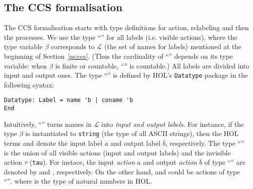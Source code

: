 
\subsection{The CCS formalisation}
\label{ss:formalCCS}

The CCS formalisation starts with type definitions for action,
relabeling and then the  processes. We use the type ``''
for all labels (i.e. visible actions), where the type variable $\beta$ corresponds
to $\mathscr{L}$ (the set of names for labels) mentioned at the beginning
of Section~\ref{ss:ccs}. (Thus the
cardinality of ``'' depends on its type variable:
when $\beta$ is finite or countable, ``'' is countable.)
All labels are divided into input and output ones.
The type ``'' is defined by HOL's \texttt{Datatype} package in the
following syntax:
\begin{lstlisting}
Datatype: Label = name 'b | coname 'b
End
\end{lstlisting}
Intuitively, ``'' turns names in $\mathscr{L}$ into \emph{input and output labels}.
For instance, if the type $\beta$ is instantiated to \texttt{string}
(the type of all ASCII strings), then the HOL terms  and
 denote the input label $a$ and output
label $\overline{b}$, respectively.
The type ``'' is the
union of all visible actions (input and output labels) and the invisible action $\tau$
(\texttt{tau}). For instace, the input \emph{action} $a$ and output
\emph{action} $\overline{b}$ of type ``''
are denoted by  and , respectively. On the
other hand,  and  could be actions of type ``'', where
 is the type of natural numbers in HOL.

